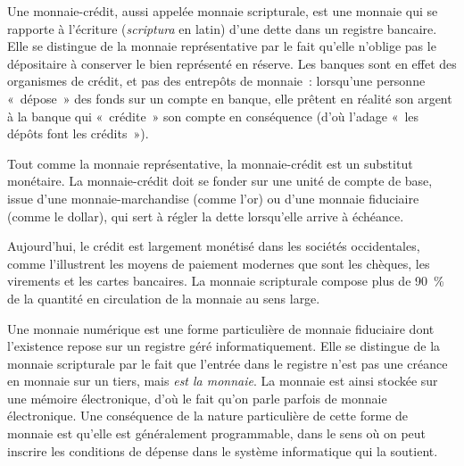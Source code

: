 
Une monnaie-crédit, aussi appelée monnaie scripturale, est une monnaie qui se rapporte à l'écriture (\emph{scriptura} en latin) d'une dette dans un registre bancaire. Elle se distingue de la monnaie représentative par le fait qu'elle n'oblige pas le dépositaire à conserver le bien représenté en réserve. Les banques sont en effet des organismes de crédit, et pas des entrepôts de monnaie~: lorsqu'une personne «~dépose~» des fonds sur un compte en banque, elle prêtent en réalité son argent à la banque qui «~crédite~» son compte en conséquence (d'où l'adage «~les dépôts font les crédits~»).

Tout comme la monnaie représentative, la monnaie-crédit est un substitut monétaire. La monnaie-crédit doit se fonder sur une unité de compte de base, issue d'une monnaie-marchandise (comme l'or) ou d'une monnaie fiduciaire (comme le dollar), qui sert à régler la dette lorsqu'elle arrive à échéance.

Aujourd'hui, le crédit est largement monétisé dans les sociétés occidentales, comme l'illustrent les moyens de paiement modernes que sont les chèques, les virements et les cartes bancaires. La monnaie scripturale compose plus de 90~\% de la quantité en circulation de la monnaie au sens large.


Une monnaie numérique est une forme particulière de monnaie fiduciaire dont l'existence repose sur un registre géré informatiquement. Elle se distingue de la monnaie scripturale par le fait que l'entrée dans le registre n'est pas une créance en monnaie sur un tiers, mais \emph{est la monnaie}. La monnaie est ainsi stockée sur une mémoire électronique, d'où le fait qu'on parle parfois de monnaie électronique. Une conséquence de la nature particulière de cette forme de monnaie est qu'elle est généralement programmable, dans le sens où on peut inscrire les conditions de dépense dans le système informatique qui la soutient.

